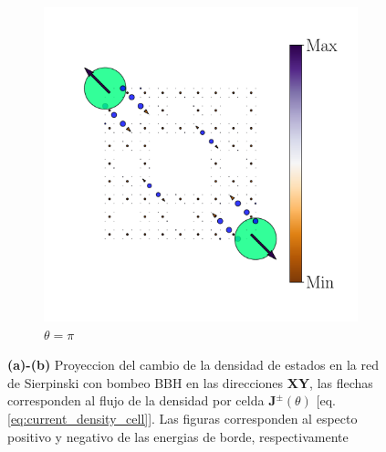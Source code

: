\begin{figure}[h!]
\begin{minipage}[h!]{1.1\textwidth}
\begin{subfigure}[b!]{0.2 \textwidth}
         \end{subfigure}\hspace*{-0.5em}
          \begin{subfigure}[b!]{0.2 \textwidth}
             \caption*{$\theta = \pi$}
             \includegraphics[width=\textwidth]{Imagenes/Resultados_pump_Fractal/xy/hoti_pomp_xy_neg5.pdf}
         \end{subfigure}\hspace*{-0.5em}
     \end{minipage}\vspace*{-0.5em}
     
    
     
     
    \caption{\textbf{(a)-(b)} Proyeccion del cambio de la densidad de estados en la red de Sierpinski con bombeo BBH en las direcciones \textbf{XY}, las flechas corresponden al flujo de la densidad por celda $\mathbf{J}^{\pm}(\theta)$ [eq. \ref{eq:current_density_cell}]. Las figuras corresponden al especto positivo y negativo de las energias de borde, respectivamente}
    \label{fig:Proy_pump_fractal_xy}
\end{figure}